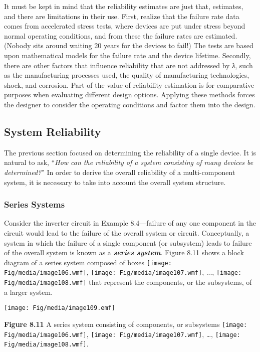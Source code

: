 It must be kept in mind that the reliability estimates are just that,
estimates, and there are limitations in their use. First, realize that
the failure rate data comes from accelerated stress tests, where devices
are put under stress beyond normal operating conditions, and from these
the failure rates are estimated. (Nobody sits around waiting 20 years
for the devices to fail!) The tests are based upon mathematical models
for the failure rate and the device lifetime. Secondly, there are other
factors that influence reliability that are not addressed by \emph{λ},
such as the manufacturing processes used, the quality of manufacturing
technologies, shock, and corrosion. Part of the value of reliability
estimation is for comparative purposes when evaluating different design
options. Applying these methods forces the designer to consider the
operating conditions and factor them into the design.

\subsection{System Reliability}\label{system-reliability-1}

The previous section focused on determining the reliability of a single
device. It is natural to ask, ``\emph{How can the reliability of a
system consisting of many devices be determined?}'' In order to derive
the overall reliability of a multi-component system, it is necessary to
take into account the overall system structure.

\subsubsection{Series Systems}\label{series-systems}

Consider the inverter circuit in Example 8.4---failure of any one
component in the circuit would lead to the failure of the overall system
or circuit. Conceptually, a system in which the failure of a single
component (or subsystem) leads to failure of the overall system is known
as a \emph{\textbf{series system}}. Figure 8.11 shows a block diagram of
a series system composed of boxes
\texttt{[image: Fig/media/image106.wmf]},
\texttt{[image: Fig/media/image107.wmf]}, ...,
\texttt{[image: Fig/media/image108.wmf]} that represent the components,
or the subsystems, of a larger system.

\texttt{[image: Fig/media/image109.emf]}

\textbf{Figure 8.11} A series system consisting of components, or
subsystems \texttt{[image: Fig/media/image106.wmf]},
\texttt{[image: Fig/media/image107.wmf]}, \ldots,
\texttt{[image: Fig/media/image108.wmf]}.

